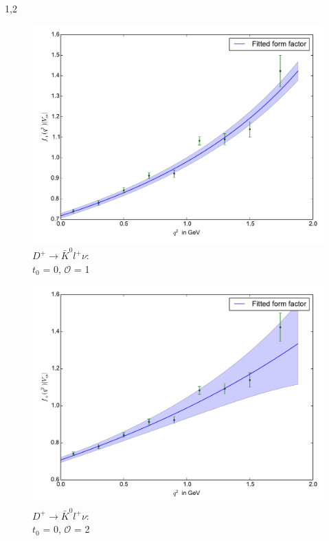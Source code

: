 \documentclass[11pt,a4paper,twoside]{report}
\begin{document}
\begin{spacing}{1,2}
 \begin{minipage}[H]{0.45\textwidth}
 \begin{figure}[H]
 \includegraphics[width=1\textwidth]{Fit/D+-1Ord-0.pdf}
 \caption{$D^+\rightarrow \bar K^0 l^+ \nu$: \\$t_0$ = 0, $\mathcal{O}$ = 1}
 \label{pic_D+-1Ord-0}
 \end{figure}
 \end{minipage}
 \hfill
 \begin{minipage}[H]{0.45\textwidth}
 \begin{figure}[H]
 \includegraphics[width=1\textwidth]{Fit/D+-2Ord-0.pdf}
 \caption{$D^+\rightarrow \bar K^0 l^+ \nu$: \\$t_0$ = 0, $\mathcal{O}$ = 2}
 \label{pic_D+-2Ord-0}
 \end{figure}
 \end{minipage}
 

\end{spacing}
\end{document}
